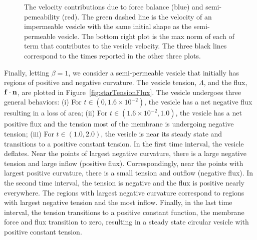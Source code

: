 \documentclass[9pt,twocolumn,twoside,lineno]{pnas-new}
\begin{document}
\begin{figure}[htp]
  \caption{\label{fig:vesVelocity} The velocity contributions due to
  force balance (blue) and semi-pemeability (red). The green dashed line
  is the velocity of an impermeable vesicle with the same initial shape
  as the semi-permeable vesicle. The bottom right plot is the max norm
  of each of term that contributes to the vesicle velocity.  The three
  black lines correspond to the times reported in the other three
  plots.}
\end{figure}


Finally, letting $\beta=1$, we consider a semi-permeable vesicle that
initially has regions of positive and negative curvature. The vesicle
tension, $\Lambda$, and the flux, $\mathbf{f} \cdot \mathbf{n}$,
are plotted in Figure~\ref{fig:starTensionFlux}. The vesicle undergoes
three general behaviors: (i) For $t \in (0,1.6 \times 10^{-2})$, the
vesicle has a net negative flux resulting in a loss of area; (ii) For $t
\in (1.6 \times 10^{-2},1.0)$, the vesicle has a net positive flux and
the tension most of the membrane is undergoing negative tension; (iii)
For $t \in (1.0,2.0)$, the vesicle is near its steady state and
transitions to a positive constant tension. In the first time interval,
the vesicle deflates. Near the points of largest negative curvature,
there is a large negative tension and large inflow (positive flux).
Correspondingly, near the points with largest positive curvature, there
is a small tension and outflow (negative flux). In the second time
interval, the tension is negative and the flux is positive nearly
everywhere. The regions with largest negative curvature correspond to
regions with largest negative tension and the most inflow. Finally, in
the last time interval, the tension transitions to a positive constant
function, the membrane force and flux transition to zero, resulting in a
steady state circular vesicle with positive constant tension.
\end{document}
